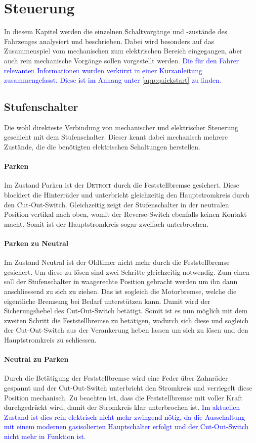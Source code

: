 \section{Steuerung}
In diesem Kapitel werden die einzelnen Schaltvorgänge und -zustände des Fahrzeuges analysiert und beschrieben. Dabei wird besonders auf das Zusammenspiel vom mechanischen zum elektrischen Bereich eingegangen, aber auch rein mechanische Vorgänge sollen vorgestellt werden. \textcolor{blue}{Die für den Fahrer relevanten Informationen wurden verkürzt in einer Kurzanleitung zusammengefasst. Diese ist im Anhang unter \ref{app:quickstart} zu finden.}

\subsection{Stufenschalter}
Die wohl direkteste Verbindung von mechanischer und elektrischer Steuerung geschieht mit dem Stufenschalter. Dieser kennt dabei mechanisch mehrere Zustände, die die benötigten elektrischen Schaltungen herstellen.

\paragraph{Parken}
Im Zustand Parken ist der \textsc{Detroit} durch die Feststellbremse gesichert. Diese blockiert die Hinterräder und unterbricht gleichzeitig den Hauptstromkreis durch den Cut-Out-Switch. Gleichzeitig zeigt der Stufenschalter in der neutralen Position vertikal nach oben, womit der Reverse-Switch ebenfalls keinen Kontakt macht. Somit ist der Hauptstromkreis sogar zweifach unterbrochen.

\paragraph{Parken zu Neutral}
Im Zustand Neutral ist der Oldtimer nicht mehr durch die Feststellbremse gesichert. Um diese zu lösen sind zwei Schritte gleichzeitig notwendig. Zum einen soll der Stufenschalter in waagerechte Position gebracht werden um ihn dann anschliessend zu sich zu ziehen. Das ist sogleich die Motorbremse, welche die eigentliche Bremsung bei Bedarf unterstützen kann. Damit wird der Sicherungshebel des Cut-Out-Switch betätigt. Somit ist es nun möglich mit dem zweiten Schritt die Feststellbremse zu betätigen, wodurch sich diese und sogleich der Cut-Out-Switch aus der Verankerung heben lassen um sich zu lösen und den Hauptstromkreis zu schliessen.

\paragraph{Neutral zu Parken}
Durch die Betätigung der Feststellbremse wird eine Feder über Zahnräder gespannt und der Cut-Out-Switch unterbricht den Stromkreis und verriegelt diese Position mechanisch. Zu beachten ist, dass die Feststellbremse mit voller Kraft durchgedrückt wird, damit der Stromkreis klar unterbrochen ist. \textcolor{blue}{Im aktuellen Zustand ist dies rein elektrisch nicht mehr zwingend nötig, da die Ausschaltung mit einem modernen gasisolierten Hauptschalter erfolgt und der Cut-Out-Switch nicht mehr in Funktion ist.}

